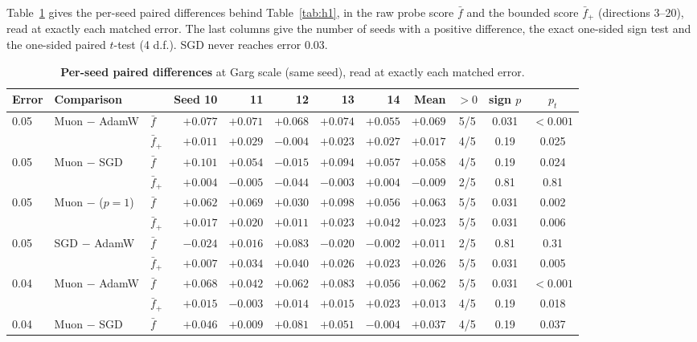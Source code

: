 Table~\ref{tab:seeds} gives the per-seed paired differences behind Table~\ref{tab:h1}, in the raw probe score $\bar f$ and the bounded score $\bar f_+$ (directions 3--20), read at exactly each matched error. The last columns give the number of seeds with a positive difference, the exact one-sided sign test and the one-sided paired $t$-test (4 d.f.). SGD never reaches error 0.03.

\begin{table}[h]
\caption{\textbf{Per-seed paired differences} at Garg scale (same seed), read at exactly each matched error.}
\label{tab:seeds}
\vspace{2pt}
\centering\footnotesize
\setlength{\tabcolsep}{2.4pt}
\begin{tabular}{@{}lllrrrrrrccc@{}}
\toprule
Error & Comparison & & Seed 10 & 11 & 12 & 13 & 14 & Mean & $>0$ & sign $p$ & $p_t$ \\
\midrule
0.05 & Muon $-$ AdamW & $\bar f$ & $+0.077$ & $+0.071$ & $+0.068$ & $+0.074$ & $+0.055$ & $+0.069$ & 5/5 & 0.031 & $<0.001$ \\
 &  & $\bar f_+$ & $+0.011$ & $+0.029$ & $-0.004$ & $+0.023$ & $+0.027$ & $+0.017$ & 4/5 & 0.19 & 0.025 \\
0.05 & Muon $-$ SGD & $\bar f$ & $+0.101$ & $+0.054$ & $-0.015$ & $+0.094$ & $+0.057$ & $+0.058$ & 4/5 & 0.19 & 0.024 \\
 &  & $\bar f_+$ & $+0.004$ & $-0.005$ & $-0.044$ & $-0.003$ & $+0.004$ & $-0.009$ & 2/5 & 0.81 & 0.81 \\
0.05 & Muon $-$ ($p{=}1$) & $\bar f$ & $+0.062$ & $+0.069$ & $+0.030$ & $+0.098$ & $+0.056$ & $+0.063$ & 5/5 & 0.031 & 0.002 \\
 &  & $\bar f_+$ & $+0.017$ & $+0.020$ & $+0.011$ & $+0.023$ & $+0.042$ & $+0.023$ & 5/5 & 0.031 & 0.006 \\
0.05 & SGD $-$ AdamW & $\bar f$ & $-0.024$ & $+0.016$ & $+0.083$ & $-0.020$ & $-0.002$ & $+0.011$ & 2/5 & 0.81 & 0.31 \\
 &  & $\bar f_+$ & $+0.007$ & $+0.034$ & $+0.040$ & $+0.026$ & $+0.023$ & $+0.026$ & 5/5 & 0.031 & 0.005 \\
\midrule
0.04 & Muon $-$ AdamW & $\bar f$ & $+0.068$ & $+0.042$ & $+0.062$ & $+0.083$ & $+0.056$ & $+0.062$ & 5/5 & 0.031 & $<0.001$ \\
 &  & $\bar f_+$ & $+0.015$ & $-0.003$ & $+0.014$ & $+0.015$ & $+0.023$ & $+0.013$ & 4/5 & 0.19 & 0.018 \\
0.04 & Muon $-$ SGD & $\bar f$ & $+0.046$ & $+0.009$ & $+0.081$ & $+0.051$ & $-0.004$ & $+0.037$ & 4/5 & 0.19 & 0.037 \\

\end{tabular}
\end{table}
